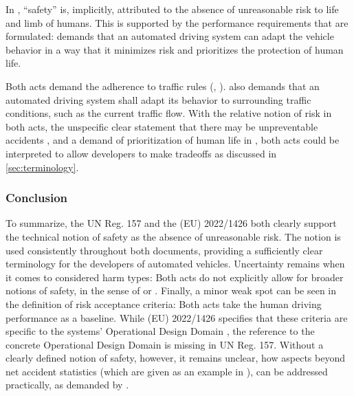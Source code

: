 In \parencite{eu1426}, ``safety'' is, implicitly, attributed to the absence of unreasonable risk to life and limb of humans.
This is supported by the performance requirements that are formulated:
\parencite[][Annex II, Clause 1.1.2. (d)]{eu1426} demands that an automated driving system can adapt the vehicle behavior in a way that it minimizes risk and prioritizes the protection of human life.

Both acts demand the adherence to traffic rules (\parencite[][Annex 2, Clause 1.3.]{eu1426}, \parencite[][Clause 5.1.2.]{un157}).
\parencite[][Annex II, Clause 1.1.2. (c)]{eu1426} also demands that an automated driving system shall adapt its behavior to surrounding traffic conditions, such as the current traffic flow.
With the relative notion of risk in both acts, the unspecific clear statement that there may be unpreventable accidents \parencite{un157}, and a demand of prioritization of human life in \parencite{eu1426}, both acts could be interpreted to allow developers to make tradeoffs as discussed in \cref{sec:terminology}.


\subsubsection{Conclusion}
To summarize, the UN Reg. 157 and the (EU) 2022/1426 both clearly support the technical notion of safety as the absence of unreasonable risk.
The notion is used consistently throughout both documents, providing a sufficiently clear terminology for the developers of automated vehicles.
Uncertainty remains when it comes to considered harm types: Both acts do not explicitly allow for broader notions of safety, in the sense of \parencite{koopman2024} or \parencite{salem2024}.
Finally, a minor weak spot can be seen in the definition of risk acceptance criteria: Both acts take the human driving performance as a baseline.
While (EU) 2022/1426 specifies that these criteria are specific to the systems' Operational Design Domain \parencite[][Annex II, Clause 7.1.1.]{eu1426}, the reference to the concrete Operational Design Domain is missing in UN Reg. 157.
Without a clearly defined notion of safety, however, it remains unclear, how aspects beyond net accident statistics (which are given as an example in \parencite[][Annex II, Clause 7.1.1.]{eu1426}), can be addressed practically, as demanded by \parencite{koopman2024}.

